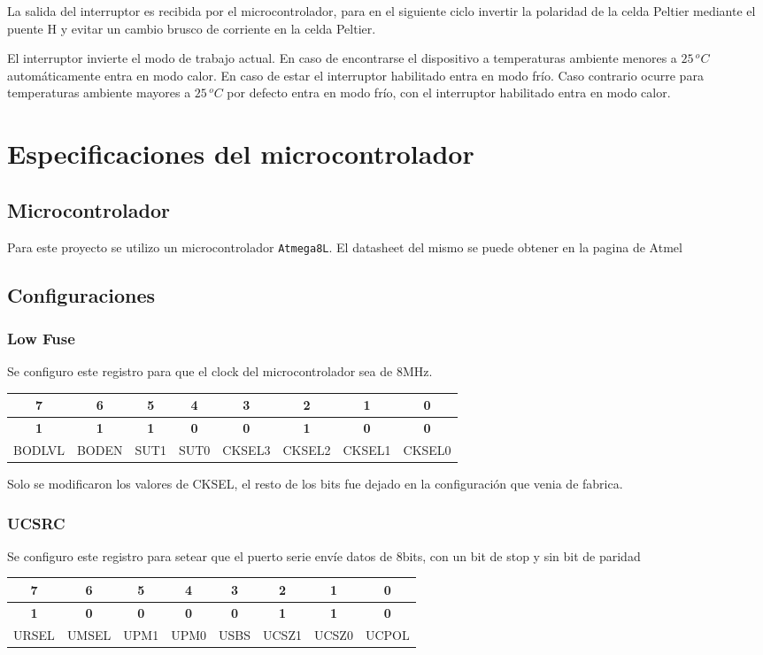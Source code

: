 \documentclass[10pt,spanish,a4paper,openany,notitlepage]{article}
\begin{document}
La salida del interruptor es recibida por el microcontrolador, para en 
el siguiente ciclo invertir la polaridad de la celda Peltier mediante el puente H y
evitar un cambio brusco de corriente en la celda Peltier.

El interruptor invierte el modo de trabajo actual. En caso de encontrarse el dispositivo a temperaturas ambiente menores a $25\, \unit{^oC}$
automáticamente entra en modo calor. En caso de estar el interruptor habilitado entra en modo frío. Caso contrario ocurre
para temperaturas ambiente mayores a $25\, \unit{^oC}$ por defecto entra en modo frío, con el interruptor habilitado entra en modo calor.

\section{Especificaciones del microcontrolador}

\subsection{Microcontrolador}
Para este proyecto se utilizo un microcontrolador \texttt{Atmega8L}. El datasheet del mismo se puede obtener en la pagina de Atmel\cite{datasheet}
\subsection{Configuraciones}
\subsubsection{Low Fuse}
Se configuro este registro para que el clock del microcontrolador sea de 8MHz. 
\begin{center}
\begin{tabular}{|c|c|c|c|c|c|c|c|}\hline
7&6&5&4&3&2&1&0\\\hline
\textbf{1}&\textbf{1}&\textbf{1}&\textbf{0}&\textbf{0}&\textbf{1}&\textbf{0}&\textbf{0}\\\hline
BODLVL&BODEN&SUT1&SUT0&CKSEL3&CKSEL2&CKSEL1&CKSEL0\\\hline
\end{tabular}
\end{center}
Solo se modificaron los valores de CKSEL, el resto de los bits fue dejado en la configuración que venia de fabrica.

\subsubsection{UCSRC}\label{UCSRC}
Se configuro este registro para setear que el puerto serie envíe datos de 8bits, con un bit de stop y sin bit de paridad
\begin{center}
\begin{tabular}{|c|c|c|c|c|c|c|c|}\hline
7&6&5&4&3&2&1&0\\\hline
\textbf{1}&\textbf{0}&\textbf{0}&\textbf{0}&\textbf{0}&\textbf{1}&\textbf{1}&\textbf{0}\\\hline
URSEL&UMSEL&UPM1&UPM0&USBS&UCSZ1&UCSZ0&UCPOL\\\hline
\end{tabular}
\end{center}
\end{document}
